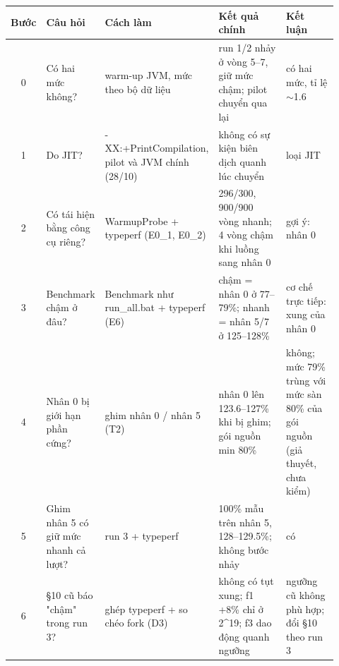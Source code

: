 \footnotesize
\begin{tabular}{cp{0.16\linewidth}p{0.22\linewidth}p{0.32\linewidth}p{0.22\linewidth}}
\toprule
Bước & Câu hỏi & Cách làm & Kết quả chính & Kết luận \\
\midrule
0 & Có hai mức không? & warm-up JVM, mức theo bộ dữ liệu & run 1/2 nhảy ở vòng 5–7, giữ mức chậm; pilot chuyển qua lại & có hai mức, tỉ lệ $\sim$1.6 \\
1 & Do JIT? & -XX:+Print\-Compilation, pilot và JVM chính (28/10) & không có sự kiện biên dịch quanh lúc chuyển & loại JIT \\
2 & Có tái hiện bằng công cụ riêng? & WarmupProbe + typeperf (E0\_1, E0\_2) & 296/300, 900/900 vòng nhanh; 4 vòng chậm khi luồng sang nhân 0 & gợi ý: nhân 0 \\
3 & Benchmark chậm ở đâu? & Benchmark như run\_all.bat + typeperf (E6) & chậm = nhân 0 ở 77–79\%; nhanh = nhân 5/7 ở 125–128\% & cơ chế trực tiếp: xung của nhân 0 \\
4 & Nhân 0 bị giới hạn phần cứng? & ghim nhân 0 / nhân 5 (T2) & nhân 0 lên 123.6–127\% khi bị ghim; gói nguồn min 80\% & không; mức 79\% trùng với mức sàn 80\% của gói nguồn (giả thuyết, chưa kiểm) \\
5 & Ghim nhân 5 có giữ mức nhanh cả lượt? & run 3 + typeperf & 100\% mẫu trên nhân 5, 128–129.5\%; không bước nhảy & có \\
6 & §10 cũ báo "chậm" trong run 3? & ghép typeperf + so chéo fork (D3) & không có tụt xung; f1 +8\% chỉ ở 2\^{}19; f3 dao động quanh ngưỡng & ngưỡng cũ không phù hợp; đổi §10 theo run 3 \\
\bottomrule
\end{tabular}
